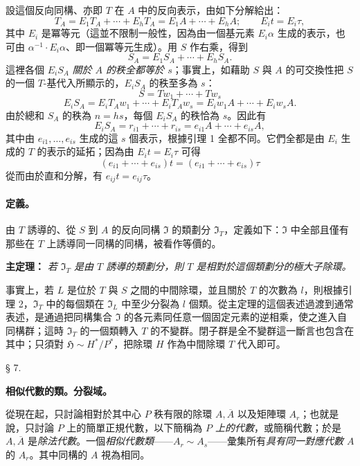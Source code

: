 \documentclass[11pt]{article}
\providecommand{\srcspaced}[1]{#1}
\begin{document}
設這個反向同構、亦即 \(T\) 在 \(A\) 中的反向表示，由如下分解給出：
\[
        T_A=E_1T_A+\cdots+E_hT_A
            =E_1A+\cdots+E_hA;\qquad E_it=E_i\tau,
\]
其中 \(E_i\) 是冪等元（這並不限制一般性，因為由一個基元素 \(E_i\alpha\) 生成的表示，也可由 \(\alpha^{-1}\cdot E_i\alpha\)、即一個冪等元生成）。用 \(S\) 作右乘，得到
\[
        S_A=E_1S_A+\cdots+E_hS_A .
\]
這裡各個 \(E_iS_A\) \emph{關於 \(A\) 的秩全都等於 \(s\)}；事實上，如藉助 \(S\) 與 \(A\) 的可交換性把 \(S\) 的一個 \(T\)-基代入所顯示的，\(E_iS_A\) 的秩至多為 \(s\)：
\[
        S=Tw_1+\cdots+Tw_s
\]
\[
        E_iS_A=E_iT_Aw_1+\cdots+E_iT_Aw_s
              =E_iw_1A+\cdots+E_iw_sA .
\]
由於總和 \(S_A\) 的秩為 \(n=hs\)，每個 \(E_iS_A\) 的秩恰為 \(s\)。因此有
\[
        E_iS_A=r_{i1}+\cdots+r_{is}
              =e_{i1}A+\cdots+e_{is}A,
\]
其中由 \(e_{i1},\ldots,e_{is}\) 生成的這 \(s\) 個表示，根據引理 1 全都不同。它們全都是由 \(E_i\) 生成的 \(T\) 的表示的延拓；因為由 \(E_it=E_i\tau\) 可得
\[
        (e_{i1}+\cdots+e_{is})t=(e_{i1}+\cdots+e_{is})\tau
\]
從而由於直和分解，有 \(e_{ij}t=e_{ij}\tau\)。

\paragraph{定義。}
由 \(T\) 誘導的、從 \(S\) 到 \(A\) 的反向同構 \(\mathfrak I\) 的類劃分 \(\mathfrak I_T\)，定義如下：\(\mathfrak I\) 中全部且僅有那些在 \(T\) 上誘導同一同構的同構，被看作等價的。

\noindent\textbf{\srcspaced{主定理：}} \emph{若 \(\mathfrak I_T\) 是由 \(T\) 誘導的類劃分，則 \(T\) 是相對於這個類劃分的極大子除環。}

事實上，若 \(L\) 是位於 \(T\) 與 \(S\) 之間的中間除環，並且關於 \(T\) 的次數為 \(l\)，則根據引理 2，\(\mathfrak I_T\) 中的每個類在 \(\mathfrak I_L\) 中至少分裂為 \(l\) 個類。從主定理的這個表述過渡到通常表述，是通過把同構集合 \(\mathfrak I\) 的各元素同任意一個固定元素的逆相乘，使之進入自同構群；這時 \(\mathfrak I_T\) 的一個類轉入 \(T\) 的不變群。閉子群是全不變群這一斷言也包含在其中；只須對 \(\mathfrak H\sim H^*/P^*\)，把除環 \(H\) 作為中間除環 \(T\) 代入即可。
\begin{center}
§ 7.

\textbf{\srcspaced{相似代數的類。分裂域。}}
\end{center}

從現在起，只討論相對於其中心 \(P\) 秩有限的除環 \(A,\overline A\) 以及矩陣環 \(A_r\)；也就是說，只討論 \(P\) 上的簡單正規代數，以下簡稱為 \emph{\(P\) 上的代數}，或簡稱代數；於是 \(A,\overline A\) 是\emph{除法代數}。一個\emph{相似代數類}——\(A_r\sim A_s\)——彙集所有\emph{具有同一對應代數 \(A\)} 的 \(A_r\)。其中同構的 \(A\) 視為相同。
\end{document}
